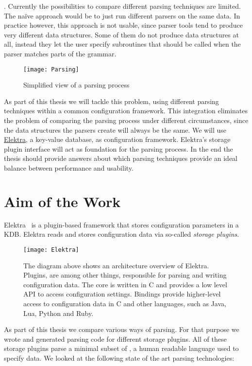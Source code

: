. Currently the possibilities to compare different parsing techniques are limited. The naïve approach would be to just run different parsers on the same data. In practice however, this approach is not usable, since parser tools tend to produce very different data structures. Some of them do not produce data structures at all, instead they let the user specify subroutines that should be called when the parser matches parts of the grammar.

\begin{figure}[H]
  \centering
    \texttt{[image: Parsing]}
  \caption{Simplified view of a parsing process}
\end{figure}

As part of this thesis we will tackle this problem, using different parsing techniques within a common configuration framework. This integration eliminates the problem of comparing the parsing process under different circumstances, since the data structures the parsers create will always be the same. We will use \href{https://libelektra.org}{Elektra}, a key-value database, as configuration framework. Elektra’s storage plugin interface will act as foundation for the parsing process. In the end the thesis should provide answers about which parsing techniques provide an ideal balance between performance and usability.

\section{Aim of the Work}
\label{sec:aim_of_the_work}

Elektra~\cite{raab2010modular, raab2017context} is a plugin-based framework that stores configuration parameters in a \gls{KDB}. Elektra reads and stores configuration data via so-called \emph{storage plugins}.

\begin{figure}[H]
  \centering
    \texttt{[image: Elektra]}
  \caption{The diagram above shows an architecture overview of Elektra. Plugins, are among other things, responsible for parsing and writing configuration data. The core is written in C and provides a low level \gls{API} to access configuration settings. Bindings provide higher-level access to configuration data in C and other languages, such as Java, Lua, Python and Ruby.}
\end{figure}

As part of this thesis we compare various ways of parsing. For that purpose we wrote and generated parsing code for different storage plugins. All of these storage plugins parse a minimal subset of , a human readable language used to specify data. We looked at the following state of the art parsing technologies:

